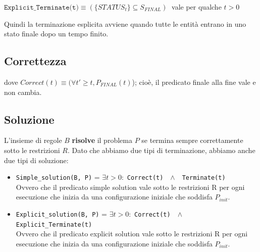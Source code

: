 \begin{center}
    $\texttt{Explicit\_Terminate(t)} \equiv (\{STATUS_t\} \subseteq S_{FINAL}) \;$ vale per qualche $t>0$
\end{center}
Quindi la terminazione esplicita avviene quando tutte le entità entrano in uno stato finale dopo un tempo finito.


\subsection{Correttezza}
dove $Correct(t) \equiv (\forall t' \ge t, P_{FINAL}(t)$); cioè, il predicato finale alla fine vale e non cambia. 

\subsection{Soluzione}
 L'insieme di regole $B$ \textbf{risolve} il problema $P$ se termina sempre correttamente sotto le restrizioni $R$. Dato che abbiamo due tipi di terminazione, abbiamo anche due tipi di soluzione:
  \begin{itemize}
    \item \texttt{Simple\_solution(B, P)} = $\exists t > 0 :$ \texttt{Correct(t)} $ ~~ \wedge ~~$ \texttt{Terminate(t)}\\
    Ovvero che il predicato simple solution vale sotto le restrizioni R per ogni esecuzione che inizia da una configurazione iniziale che soddisfa $P_{init}$.
    
    \item \texttt{Explicit\_solution(B, P)} = $\exists t > 0 :$ \texttt{Correct(t)} $ ~~ \wedge ~~$ \texttt{Explicit\_Terminate(t)}\\
        Ovvero che il predicato explicit solution vale sotto le restrizioni R per ogni esecuzione che inizia da una configurazione iniziale che soddisfa $P_{init}$.
  \end{itemize}

